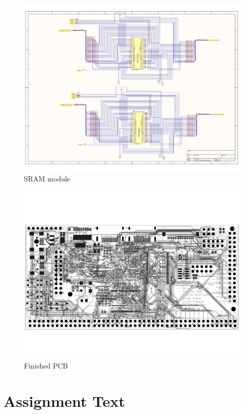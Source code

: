 \begin{figure}
    \includegraphics[width=\paperwidth, angle=90]{img/RAM_module.pdf}
    \caption{SRAM module}
    \label{fig:RAM_module}
\end{figure}

\begin{figure}
    \includegraphics[width=\paperwidth, angle=90]{img/PCB_Finished.pdf}
    \caption{Finished PCB}
    \label{fig:PCB_Finished}
\end{figure}

\chapter{Assignment Text}
\label{app:assignment_text}


